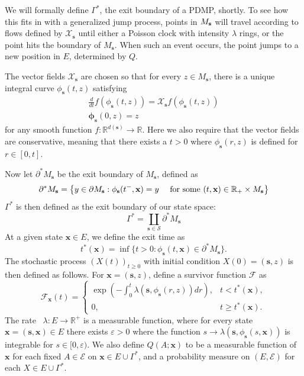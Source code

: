 We will formally define $\Gamma^*$, the exit boundary of a PDMP, shortly. To see how this fits in with a generalized jump process, points in $M_{\textbf s}$ will travel according to flows defined by $\mathcal X_\mathbf s$ until either a Poisson clock with intensity $\lambda$ rings, or the point hits the boundary of $M_\mathbf s$. When such an event occurs, the point jumps to a new position in $E$, determined by $Q$.   

The vector fields $\mathcal X_\mathbf s$ are chosen so that for every $z \in M_\mathbf s$, there is a unique integral curve $\phi_\mathbf s(t,z)$ satisfying 
\begin{eqnarray}
 \frac d{dt}f(\phi_\mathbf s(t,z)) = \mathcal X _{\mathbf s}f(\phi_\mathbf s(t,z))\\
 \mathbf \phi_\mathbf s(0,z) =  z \nonumber 
\end{eqnarray}
for any smooth function $f: \mathbb{R}^{d(\mathbf s)} \rightarrow \mathbb{R}$.  Here we also require that the vector fields are conservative, meaning that there exists a $t>0$ where $\phi_\mathbf s(r,z)$ is defined for $r \in [0,t]$.   

 Now let $\partial^*M_\mathbf s$ be the exit boundary of $M_\mathbf s$, defined as
  \begin{equation}
 \partial^*M_\mathbf s =\left \{y \in \partial M_\mathbf s: \phi_\mathbf s(t^-, \textbf{x}) = y \quad \hbox{ for some } (t, \textbf{x}) \in \mathbb{R}_+ \times M_\mathbf s\right \}
\end{equation}
 $\Gamma^*$ is then defined as the exit boundary of our state space:
\begin{equation}
\Gamma^* = \coprod_{\mathbf s \in \mathcal S} \partial ^{*}M_\mathbf s 
\end{equation}
At a given state $\mathbf x \in E$, we define the exit time as 
\begin{equation}
t^*(\mathbf x) = \inf \{t >0: \phi_\mathbf s(t, \textbf{x}) \in \partial ^{*}M_\mathbf s\}.  
\end{equation}
The stochastic process $(X(t))_{t \ge 0}$ with initial condition $X(0) =  (\mathbf s,z)$ is then defined as follows.  For $\mathbf x = (\mathbf s, z)$, define a survivor function $\mathcal F$ as 
\begin{equation}
\mathcal F_{\mathbf x}(t) = \begin{cases} \exp\left(-\int_0^t \lambda(\mathbf s,\phi_\mathbf s(r,z))dr\right), & t<t^*(\textbf{x}), \\ 0, & t \ge t^*(\textbf{x}).
\end{cases} 
\end{equation}
The rate \ $\lambda:E \rightarrow \mathbb R^+$ is a measurable function, where for every state $\textbf{x} = (\mathbf s,  \textbf{x}) \in E$ there exists $\varepsilon > 0$ where the function $s \rightarrow \lambda(\mathbf s, \phi_\mathbf s(s, \textbf{x}))$ is integrable for $s \in [0,\varepsilon)$.  We also define $Q(A;\textbf{x})$ to be a measurable function of $\textbf{x}$ for each fixed $A \in \mathcal E$ on $\textbf{x} \in E \cup \Gamma^*$, and a probability measure on $(E, \mathcal E)$ for each $X \in E \cup \Gamma^*$.


